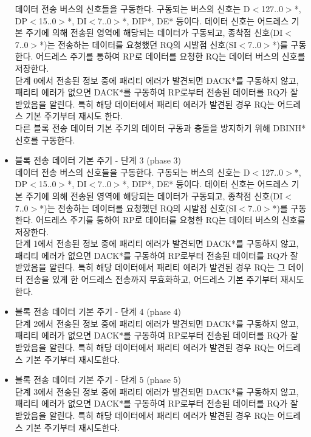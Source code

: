 \begin{itemize}
	데이터 전송 버스의 신호들을 구동한다.
	구동되는 버스의 신호는 D$<$127..0$>$*, DP$<$15..0$>$*,
	DI$<$7..0$>$*, DIP*, DE* 등이다.
	데이터 신호는 어드레스 기본 주기에 의해 전송된 영역에 해당되는 데이터가 구동되고,
	종착점 신호(DI$<$7..0$>$*)는 전송하는 데이터를 요청했던
	RQ의 시발점 신호(SI$<$7..0$>$*)를 구동한다.
	어드레스 주기를 통하여 RP로 데이터를 요청한 RQ는
	데이터 버스의 신호를 저장한다. \\
	단계 0에서 전송된 정보 중에 패리티 에러가 발견되면 
	DACK*를 구동하지 않고, 패리티 에러가 없으면 DACK*를 구동하여 RP로부터 전송된
	데이터를 RQ가 잘 받았음을 알린다.
	특히 해당 데이터에서 패리티 에러가 발견된 경우 RQ는 어드레스 기본 주기부터 재시도 한다. \\
	다른 블록 전송 데이터 기본 주기의 데이터 구동과 충돌을 방지하기 위해
	DBINH* 신호를 구동한다.
%
	\item 블록 전송 데이터 기본 주기 - 단계 3 (phase 3)\\
	데이터 전송 버스의 신호들을 구동한다.
	구동되는 버스의 신호는 D$<$127..0$>$*, DP$<$15..0$>$*,
	DI$<$7..0$>$*, DIP*, DE* 등이다.
	데이터 신호는 어드레스 기본 주기에 의해 전송된 영역에 해당되는 데이터가 구동되고,
	종착점 신호(DI$<$7..0$>$*)는 전송하는 데이터를 요청했던
	RQ의 시발점 신호(SI$<$7..0$>$*)를 구동한다.
	어드레스 주기를 통하여 RP로 데이터를 요청한 RQ는
	데이터 버스의 신호를 저장한다. \\
	단계 1에서 전송된 정보 중에 패리티 에러가 발견되면 
	DACK*를 구동하지 않고, 패리티 에러가 없으면 DACK*를 구동하여 RP로부터 전송된
	데이터를 RQ가 잘 받았음을 알린다.
	특히 해당 데이터에서 패리티 에러가 발견된 경우 RQ는 그 데이터 전송을 있게 한 어드레스 전송까지 무효화하고,
	어드레스 기본 주기부터 재시도한다.
	\item 블록 전송 데이터 기본 주기 - 단계 4 (phase 4)\\
	단계 2에서 전송된 정보 중에 패리티 에러가 발견되면 
	DACK*를 구동하지 않고, 패리티 에러가 없으면 DACK*를 구동하여 RP로부터 전송된
	데이터를 RQ가 잘 받았음을 알린다.
	특히 해당 데이터에서 패리티 에러가 발견된 경우 RQ는
	어드레스 기본 주기부터 재시도한다.
	\item 블록 전송 데이터 기본 주기 - 단계 5 (phase 5)\\
	단계 3에서 전송된 정보 중에 패리티 에러가 발견되면 
	DACK*를 구동하지 않고, 패리티 에러가 없으면 DACK*를 구동하여 RP로부터 전송된
	데이터를 RQ가 잘 받았음을 알린다.
	특히 해당 데이터에서 패리티 에러가 발견된 경우 RQ는
	어드레스 기본 주기부터 재시도한다.
\end{itemize}
%
